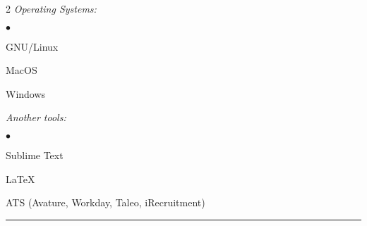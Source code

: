 \documentclass[oneside,final,12pt]{extreport}
\newenvironment{compactlist}{
	\begin{list}{{$\bullet$}}{
		\setlength\leftmargin{0.4cm}
		\setlength\partopsep{0pt}
		\setlength\parskip{0pt}
		\setlength\parsep{0pt}
		\setlength\topsep{0pt}
		\setlength\itemsep{0pt}
	}
}{
	\end{list}
}
\begin{document}
\begin{multicols}{2}
\textsl{Operating Systems:}
	\begin{compactlist}
		\item GNU/Linux
		\item MacOS
		\item Windows
	\end{compactlist}
\textsl{Another tools:}
	\begin{compactlist}
		\item Sublime Text
		\item LaTeX
		\item ATS (Avature, Workday, Taleo, iRecruitment)
	\end{compactlist}
\end{multicols}
\rule{\textwidth}{0.4pt}
\end{document}

